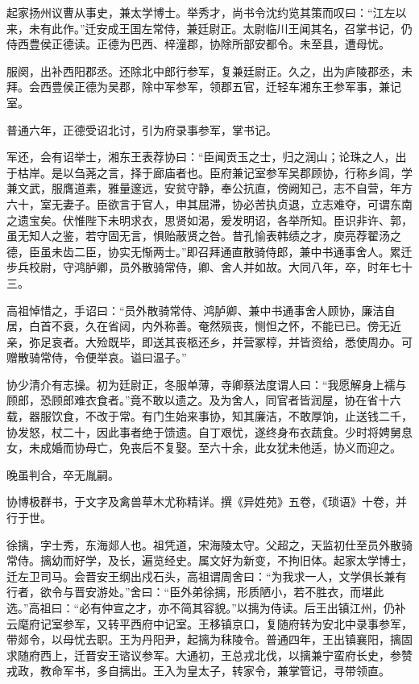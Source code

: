 \documentclass[12pt,UTF8]{ctexbook}
\begin{document}
起家扬州议曹从事史，兼太学博士。举秀才，尚书令沈约览其策而叹曰：“江左以来，未有此作。”迁安成王国左常侍，兼廷尉正。太尉临川王闻其名，召掌书记，仍侍西豊侯正德读。正德为巴西、梓潼郡，协除所部安都令。未至县，遭母忧。

服阕，出补西阳郡丞。还除北中郎行参军，复兼廷尉正。久之，出为庐陵郡丞，未拜。会西豊侯正德为吴郡，除中军参军，领郡五官，迁轻车湘东王参军事，兼记室。

普通六年，正德受诏北讨，引为府录事参军，掌书记。

军还，会有诏举士，湘东王表荐协曰：“臣闻贡玉之士，归之润山；论珠之人，出于枯岸。是以刍荛之言，择于廊庙者也。臣府兼记室参军吴郡顾协，行称乡闾，学兼文武，服膺道素，雅量邃远，安贫守静，奉公抗直，傍阙知己，志不自营，年方六十，室无妻子。臣欲言于官人，申其屈滞，协必苦执贞退，立志难夺，可谓东南之遗宝矣。伏惟陛下未明求衣，思贤如渴，爰发明诏，各举所知。臣识非许、郭，虽无知人之鉴，若守固无言，惧贻蔽贤之咎。昔孔愉表韩绩之才，庾亮荐翟汤之德，臣虽未齿二臣，协实无惭两士。”即召拜通直散骑侍郎，兼中书通事舍人。累迁步兵校尉，守鸿胪卿，员外散骑常侍，卿、舍人并如故。大同八年，卒，时年七十三。

高祖悼惜之，手诏曰：“员外散骑常侍、鸿胪卿、兼中书通事舍人顾协，廉洁自居，白首不衰，久在省闼，内外称善。奄然殒丧，恻怛之怀，不能已已。傍无近亲，弥足哀者。大殓既毕，即送其丧柩还乡，并营冢椁，并皆资给，悉使周办。可赠散骑常侍，令便举哀。谥曰温子。”

协少清介有志操。初为廷尉正，冬服单薄，寺卿蔡法度谓人曰：“我愿解身上襦与顾郎，恐顾郎难衣食者。”竟不敢以遗之。及为舍人，同官者皆润屋，协在省十六载，器服饮食，不改于常。有门生始来事协，知其廉洁，不敢厚饷，止送钱二千，协发怒，杖二十，因此事者绝于馈遗。自丁艰忧，遂终身布衣蔬食。少时将娉舅息女，未成婚而协母亡，免丧后不复娶。至六十余，此女犹未他适，协义而迎之。

晚虽判合，卒无胤嗣。

协博极群书，于文字及禽兽草木尤称精详。撰《异姓苑》五卷，《琐语》十卷，并行于世。

徐摛，字士秀，东海郯人也。祖凭道，宋海陵太守。父超之，天监初仕至员外散骑常侍。摛幼而好学，及长，遍览经史。属文好为新变，不拘旧体。起家太学博士，迁左卫司马。会晋安王纲出戍石头，高祖谓周舍曰：“为我求一人，文学俱长兼有行者，欲令与晋安游处。”舍曰：“臣外弟徐摛，形质陋小，若不胜衣，而堪此选。”高祖曰：“必有仲宣之才，亦不简其容貌。”以摛为侍读。后王出镇江州，仍补云麾府记室参军，又转平西府中记室。王移镇京口，复随府转为安北中录事参军，带郯令，以母忧去职。王为丹阳尹，起摛为秣陵令。普通四年，王出镇襄阳，摛固求随府西上，迁晋安王谘议参军。大通初，王总戎北伐，以摛兼宁蛮府长史，参赞戎政，教命军书，多自摛出。王入为皇太子，转家令，兼掌管记，寻带领直。
\end{document}
